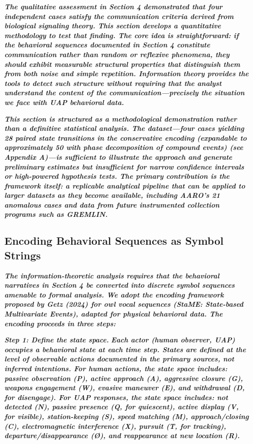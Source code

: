 \documentclass[11pt,letterpaper]{article}
\begin{document}
\textbf{\textit{The qualitative assessment in Section 4 demonstrated that four independent cases satisfy the communication criteria derived from biological signaling theory. This section develops a quantitative methodology to test that finding. The core idea is straightforward: if the behavioral sequences documented in Section 4 constitute communication rather than random or reflexive phenomena, they should exhibit measurable structural properties that distinguish them from both noise and simple repetition. Information theory provides the tools to detect such structure without requiring that the analyst understand the content of the communication---precisely the situation we face with UAP behavioral data.}}


\textbf{\textit{This section is structured as a methodological demonstration rather than a definitive statistical analysis. The dataset---four cases yielding 28 paired state transitions in the conservative encoding (expandable to approximately 50 with phase decomposition of compound events) (see Appendix A)---is sufficient to illustrate the approach and generate preliminary estimates but insufficient for narrow confidence intervals or high-powered hypothesis tests. The primary contribution is the framework itself: a replicable analytical pipeline that can be applied to larger datasets as they become available, including AARO's 21 anomalous cases and data from future instrumented collection programs such as GREMLIN.}}


\subsection{Encoding Behavioral Sequences as Symbol Strings}

\textbf{\textit{The information-theoretic analysis requires that the behavioral narratives in Section 4 be converted into discrete symbol sequences amenable to formal analysis. We adopt the encoding framework proposed by Getz (2024) for owl vocal sequences (StaME: State-based Multivariate Events), adapted for physical behavioral data. The encoding proceeds in three steps:}}


\textbf{\textit{Step 1: Define the state space.}}\textbf{\textit{ Each actor (human observer, UAP) occupies a behavioral state at each time step. States are defined at the level of observable actions documented in the primary sources, not inferred intentions. For human actions, the state space includes: passive observation (P), active approach (A), aggressive closure (G), weapons engagement (W), evasive maneuver (E), and withdrawal (D, for disengage). For UAP responses, the state space includes: not detected (N), passive presence (Q, for quiescent), active display (V, for visible), station-keeping (S), speed matching (M), approach/closing (C), electromagnetic interference (X), pursuit (T, for tracking), departure/disappearance ({\O}), and reappearance at new location (R).}}
\end{document}
